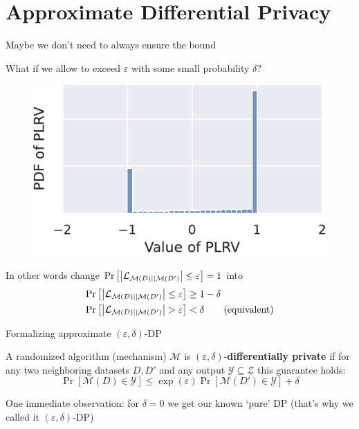 \documentclass[12pt,aspectratio=169,handout]{beamer}
\begin{document}
\section{Approximate Differential Privacy}


\begin{frame}{Maybe we don't need to always ensure the bound}

What if we allow to exceed $\varepsilon$ with some small probability $\delta$?
\begin{figure}
\centering
\includegraphics[width=0.5\linewidth]{img/loss1.pdf}
\end{figure}

In other words change $
\Pr\left[\abs{\mathcal{L}_{\mathcal{M}(D) || \mathcal{M}(D')}} \leq \varepsilon \right]
= 1
$
into
$$
\begin{aligned}
\Pr\left[\abs{\mathcal{L}_{\mathcal{M}(D) || \mathcal{M}(D')}} \leq \varepsilon \right]
&\geq 1 - \delta \\
\Pr\left[\abs{\mathcal{L}_{\mathcal{M}(D) || \mathcal{M}(D')}} > \varepsilon \right]
&< \delta \qquad \text{(equivalent)}
\end{aligned}
$$

\end{frame}


\begin{frame}{Formalizing approximate $(\varepsilon, \delta)$-DP}


A randomized algorithm (mechanism) $\mathcal{M}$ is $(\varepsilon, \delta)$-\textbf{differentially private} if for any two neighboring datasets $D, D'$ and any output $\mathcal{Y} \subseteq \mathcal{Z}$ this guarantee holds:
$$
\Pr[\mathcal{M}(D) \in \mathcal{Y}] \leq \exp(\varepsilon) \Pr[\mathcal{M}(D') \in \mathcal{Y}] + \delta
$$


One immediate observation: for $\delta = 0$ we get our known `pure' DP (that's why we called it $(\varepsilon, \delta)$-DP)


\end{frame}
\end{document}
